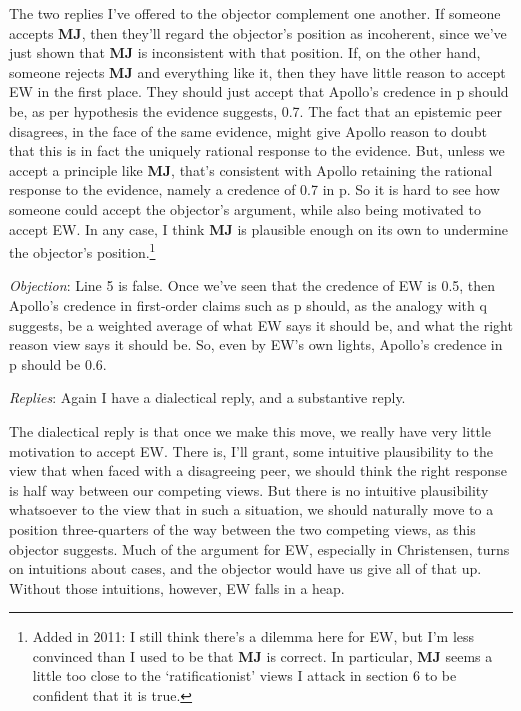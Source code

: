 The two replies I've offered to the objector complement one another. If someone accepts \textbf{MJ}, then they'll regard the objector's position as incoherent, since we've just shown that \textbf{MJ} is inconsistent with that position. If, on the other hand, someone rejects \textbf{MJ} and everything like it, then they have little reason to accept EW in the first place. They should just accept that Apollo's credence in p should be, as per hypothesis the evidence suggests, 0.7. The fact that an epistemic peer disagrees, in the face of the same evidence, might give Apollo reason to doubt that this is in fact the uniquely rational response to the evidence. But, unless we accept a principle like \textbf{MJ}, that's consistent with Apollo retaining the rational response to the evidence, namely a credence of 0.7 in p. So it is hard to see how someone could accept the objector's argument, while also being motivated to accept EW. In any case, I think \textbf{MJ} is plausible enough on its own to undermine the objector's position.\footnote{Added in 2011: I still think there's a dilemma here for EW, but I'm less convinced than I used to be that \textbf{MJ} is correct. In particular, \textbf{MJ} seems a little too close to the `ratificationist' views I attack in section 6 to be confident that it is true.}

\medskip \noindent \textit{Objection}: Line 5 is false. Once we've seen that the credence of EW is 0.5, then Apollo's credence in first-order claims such as p should, as the analogy with q suggests, be a weighted average of what EW says it should be, and what the right reason view says it should be. So, even by EW's own lights, Apollo's credence in p should be 0.6.

\smallskip \noindent \textit{Replies}: Again I have a dialectical reply, and a substantive reply.

The dialectical reply is that once we make this move, we really have very little motivation to accept EW. There is, I'll grant, some intuitive plausibility to the view that when faced with a disagreeing peer, we should think the right response is half way between our competing views. But there is no intuitive plausibility whatsoever to the view that in such a situation, we should naturally move to a position three-quarters of the way between the two competing views, as this objector suggests. Much of the argument for EW, especially in Christensen, turns on intuitions about cases, and the objector would have us give all of that up. Without those intuitions, however, EW falls in a heap.

